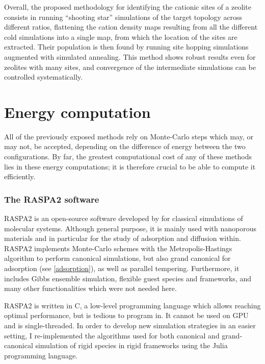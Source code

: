 \documentclass[main.tex]{subfiles}
\begin{document}
Overall, the proposed methodology for identifying the cationic sites of a zeolite consists in running ``shooting star'' simulations of the target topology across different \SiAl ratios, flattening the cation density maps resulting from all the different cold simulations into a single map, from which the location of the sites are extracted. Their population is then found by running site hopping simulations augmented with simulated annealing. This method shows robust results even for zeolites with many sites, and convergence of the intermediate simulations can be controlled systematically.

\section{Energy computation}\label{energy_computation}

All of the previously exposed methods rely on Monte-Carlo steps which may, or may not, be accepted, depending on the difference of energy between the two configurations. By far, the greatest computational cost of any of these methods lies in these energy computations; it is therefore crucial to be able to compute it efficiently.

\subsubsection{The RASPA2 software}

RASPA2 is an open-source software developed by \textcite{RASPA} for classical simulations of molecular systems. Although general purpose, it is mainly used with nanoporous materials and in particular for the study of adsorption and diffusion within. RASPA2 implements Monte-Carlo schemes with the Metropolis-Hastings algorithm to perform canonical simulations, but also grand canonical for adsorption (see \cref{adsorption}), as well as parallel tempering. Furthermore, it includes Gibbs ensemble simulation, flexible guest species and frameworks, and many other functionalities which were not needed here.

RASPA2 is written in C, a low-level programming language which allows reaching optimal performance, but is tedious to program in. It cannot be used on GPU and is single-threaded. In order to develop new simulation strategies in an easier setting, I re-implemented the algorithms used for both canonical and grand-canonical simulation of rigid species in rigid frameworks using the Julia programming language\autocite{Julia,JuliaDesign}.
\end{document}
